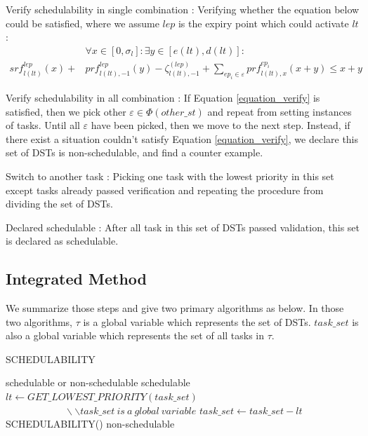 \documentclass[sigconf]{acmart}
\begin{document}
\begin{compactdesc}
  \item[Verify schedulability in single combination]: Verifying whether the equation below could be satisfied, where we assume $lep$ is the expiry point which could activate $lt$:
  \begin{equation}\begin{split}
      &\forall x\in[0,\sigma_l]:\exists y\in[e(lt),d(lt)]:\\
      srf^{lep}_{l(lt)}(x)+&prf^{lep}_{l(lt),-1}(y)-\zeta^{(lep)}_{l(lt),-1}+\sum\limits_{ep_i\in\varepsilon}prf^{ep_i}_{l(lt),x}(x+y)\leq x+y
    \end{split}\label{equation_verify}\end{equation}
  
  \item[Verify schedulability in all combination]: If Equation \ref{equation_verify} is satisfied, then we pick other $\varepsilon\in\Phi(other\_st)$ and repeat from setting instances of tasks. Until all $\varepsilon$ have been picked, then we move to the next step. Instead, if there exist a situation couldn't satisfy Equation \ref{equation_verify}, we declare this set of DSTs is non-schedulable, and find a counter example.
  \item[Switch to another task]: Picking one task with the lowest priority in this set except tasks already passed verification and repeating the procedure from dividing the set of DSTs.
  \item[Declared schedulable]: After all task in this set of DSTs passed validation, this set is declared as schedulable. 
\end{compactdesc}

\subsection{Integrated Method}
We summarize those steps and give two primary algorithms as below. In those two algorithms, $\tau$ is a global variable which represents the set of DSTs. $task\_set$ is also a global variable which represents the set of all tasks in $\tau$.

\begin{algorithm}
  \caption{SCHEDULABILITY}
  \label{algorithm_schedulability}
  \begin{algorithmic}[1]
    \REQUIRE 
    \ENSURE schedulable or non-schedulable 
    \STATE \Return schedulable
    \ELSE \STATE $lt \leftarrow GET\_LOWEST\_PRIORITY(task\_set)$\\$\qquad\qquad\qquad\backslash\backslash task\_set\ is\ a\ global\ variable$
    \STATE $task\_set\leftarrow task\_set-lt$
    \STATE \Return SCHEDULABILITY()
    \ELSE
    \STATE \Return non-schedulable 
    \ENDIF
    \ENDIF
  \end{algorithmic}
\end{algorithm}
\end{document}
